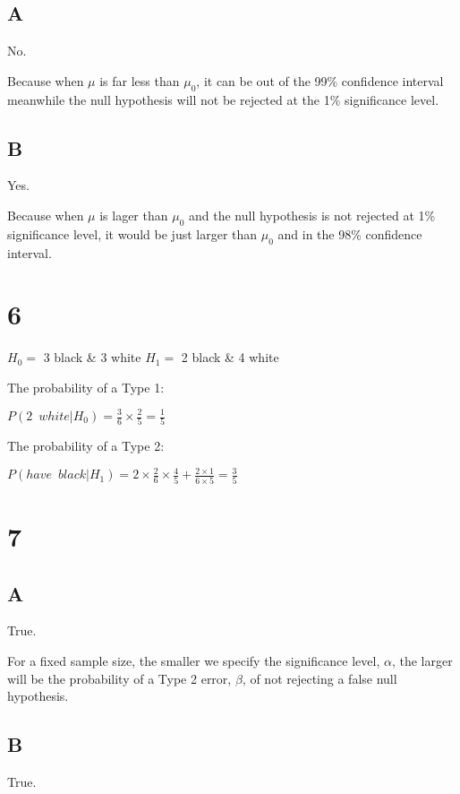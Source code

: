 \documentclass{article}
\begin{document}
	\subsection*{A}
	No.
	
	Because when $\mu$ is far less than $\mu_0$, it can be out of the 99\% confidence interval meanwhile the null hypothesis will not be rejected at the 1\% significance level.
	
	\subsection*{B}
	Yes. 
	
	Because when $\mu$ is lager than $\mu_0$ and the null hypothesis is not rejected at 1\% significance level, it would be just larger than $\mu_0$ and in the 98\% confidence interval. 
	
	
	\section*{6}
	$H_0=$ 3 black \& 3 white
	$H_1=$ 2 black \& 4 white
	
	The probability of a Type 1:
	
	$P(2\enspace white|H_0)=\frac{3}{6}\times\frac{2}{5}=\frac{1}{5}$
	
	\hspace{\fill}
	
	The probability of a Type 2:
	
	$P(have\enspace black|H_1)=2\times\frac{2}{6}\times\frac{4}{5}+\frac{2\times1}{6\times 5}=\frac{3}{5}$
	
	
	\section*{7}
	
	\subsection*{A}
	
	True.
	
	For a fixed sample size, the smaller we specify the significance level, $\alpha$, the
larger will be the probability of a Type 2 error, $\beta$, of not rejecting a false null hypothesis.
	
	\subsection*{B}
	
	True.
	
\end{document}
